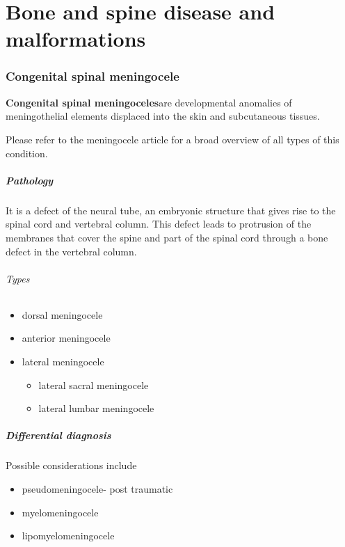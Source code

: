 \chapter{Bone and spine disease and malformations}

\subsection{Congenital spinal meningocele}

\textbf{Congenital spinal meningoceles}are developmental anomalies of meningothelial elements displaced into the skin and subcutaneous tissues.

Please refer to the meningocele article for a broad overview of all types of this condition.

\paragraph{Pathology}

It is a defect of the neural tube, an embryonic structure that gives rise to the spinal cord and vertebral column. This defect leads to protrusion of the membranes that cover the spine and part of the spinal cord through a bone defect in the vertebral column.

\subparagraph{Types}

\begin{itemize}
	\tightlist
	\item
	dorsal meningocele
	\item
	anterior meningocele
	\item
	lateral meningocele
	
	\begin{itemize}
		\tightlist
		\item
		lateral sacral meningocele
		\item
		lateral lumbar meningocele
	\end{itemize}
\end{itemize}

\paragraph{Differential diagnosis}

Possible considerations include

\begin{itemize}
	\tightlist
	\item
	pseudomeningocele- post traumatic
	\item
	myelomeningocele
	\item
	lipomyelomeningocele
\end{itemize}

